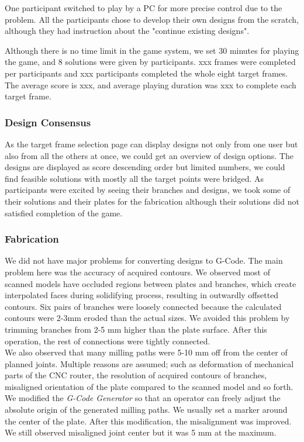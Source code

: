 One participant switched to play by a PC for more precise control due to the problem.
All the participants chose to develop their own designs from the scratch, although they had instruction about the "continue existing designs".

Although there is no time limit in the game system, we set 30 minutes for playing the game, and 8 solutions were given by participants.
xxx frames were completed per participants and xxx participants completed the whole eight target frames.
The average score is xxx, and average playing duration was xxx to complete each target frame.

\subsubsection*{Design Consensus }
As the target frame selection page can display designs not only from one user but also from all the others at once, we could get an overview of design options.
The designs are displayed as score descending order but limited numbers, we could find feasible solutions with mostly all the target points were bridged.
As participants were excited by seeing their branches and designs, we took some of their solutions and their plates for the fabrication although their solutions did not satisfied completion of the game.

\subsubsection*{Fabrication}
We did not have major problems for converting designs to G-Code.
The main problem here was the accuracy of acquired contours.
We observed most of scanned models have occluded regions between plates and branches, which create interpolated faces during solidifying process, resulting in outwardly offsetted contours.
Six pairs of branches were loosely connected because the calculated contours were 2-3mm eroded than the actual sizes.
We avoided this problem by trimming branches from 2-5 mm higher than the plate surface.
After this operation, the rest of connections were tightly connected. \\

We also observed that many milling paths were 5-10 mm off from the center of planned joints.
Multiple reasons are assumed; such as deformation of mechanical parts of the CNC router, the resolution of acquired contours of branches, misaligned orientation of the plate compared to the scanned model and so forth.
We modified the \textit{G-Code Generator} so that an operator can freely adjust the absolute origin of the generated milling paths.
We usually set a marker around the center of the plate.
After this modification, the misalignment was improved.
We still observed misaligned joint center but it was 5 mm at the maximum.

